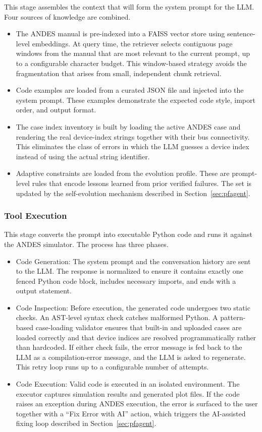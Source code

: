 \documentclass[journal]{IEEEtran}
\begin{document}
This stage assembles the context that will form the system
prompt for the LLM. Four sources of knowledge are combined.
\begin{itemize}
\item The ANDES manual is pre-indexed into a FAISS vector store using sentence-level embeddings. 
At query time, the retriever selects contiguous page windows from the manual that are most relevant to the current prompt, up to a configurable character budget.
This window-based strategy avoids the fragmentation that arises from small, independent chunk retrieval.
\item Code examples are loaded from a curated JSON file and injected into the system prompt. 
These examples demonstrate the expected code style, import order, and output format.
\item The case index inventory is built by loading the
active ANDES case and rendering the real device-index strings together with their bus connectivity.
This eliminates the class of errors in which the LLM guesses a device index instead of using the actual string identifier.
\item Adaptive constraints are loaded from the evolution profile.
These are prompt-level rules that encode lessons learned from prior verified failures. The set is updated by the self-evolution mechanism described in Section~\ref{sec:pfagent}.
\end{itemize}

\subsubsection{Tool Execution}

This stage converts the prompt into executable Python code
and runs it against the ANDES simulator. The process has three phases.
\begin{itemize}
\item Code Generation: The system prompt and the conversation history are sent to the LLM.
The response is normalized to ensure it contains exactly one fenced Python code block, includes necessary imports, and ends with a output statement.
\item Code Inspection: Before execution, the generated code undergoes two static checks.
An AST-level syntax check catches malformed Python.
A pattern-based case-loading validator ensures that built-in and uploaded cases are loaded correctly and that device
indices are resolved programmatically rather than hardcoded.
If either check fails, the error message is fed back to the LLM as a compilation-error message, and the LLM is asked to regenerate.
This retry loop runs up to a configurable number of attempts.
\item Code Execution: Valid code is executed in an isolated environment.
The executor captures simulation results and generated plot files.
If the code raises an exception during ANDES execution, the error is surfaced to the user together with a ``Fix Error with AI'' action, which triggers the AI-assisted fixing
loop described in Section~\ref{sec:pfagent}.
\end{itemize}
\end{document}

